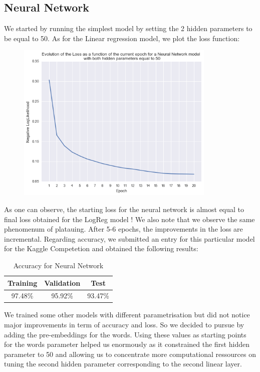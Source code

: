 \documentclass[11pt]{article}
\begin{document}
\subsection{Neural Network}

We started by running the simplest model by setting the 2 hidden parameters to be equal to 50. As for the Linear regression model, we plot the loss function:

\begin{figure}[H]
\centering
\includegraphics[width=9.5cm]{nn1}
\end{figure}

\noindent As one can observe, the starting loss for the neural network is almost equal to final loss obtained for the LogReg model ! We also note that we observe the same phenomenum of platauing. After 5-6 epochs, the improvements in the loss are incremental. Regarding accuracy, we submitted an entry for this particular model for the Kaggle Competetion and obtained the following results:

\begin{table}[H]
\centering
\label{my-label2}
\begin{tabular}{|c|c|c|}
\hline
Training & Validation & Test    \\ \hline
97.48\%  & 95.92\%    & 93.47\% \\ \hline
\end{tabular}
\caption{Accuracy for Neural Network}
\end{table}

\noindent We trained some other models with different parametrisation but did not notice major improvements in term of accuracy and loss. So we decided to pursue by adding the pre-embeddings for the words. Using these values as starting points for the words parameter helped us enormously as it constrained the first hidden parameter to 50 and allowing us to concentrate more computational ressources on tuning the second hidden parameter corresponding to the second linear layer.\\
\end{document}
